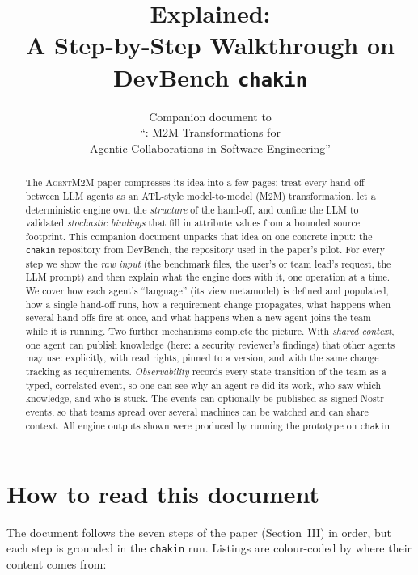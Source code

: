 \documentclass[10pt,a4paper]{article}
\title{\tool{} Explained:\\ A Step-by-Step Walkthrough on DevBench \texttt{chakin}}
\author{Companion document to\\ ``\tool{}: M2M Transformations for\\ Agentic
Collaborations in Software Engineering''}
\date{}
\newcommand{\tool}{\textsc{AgentM2M}}
\theoremstyle{definition}
\begin{document}
\maketitle

\begin{abstract}
The \tool{} paper compresses its idea into a few pages: treat every hand-off
between LLM agents as an ATL-style model-to-model (M2M) transformation, let a
deterministic engine own the \emph{structure} of the hand-off, and confine the
LLM to validated \emph{stochastic bindings} that fill in attribute values from
a bounded source footprint. This companion document unpacks that idea on one
concrete input: the \texttt{chakin} repository from DevBench, the repository
used in the paper's pilot. For every step we show the \emph{raw input} (the
benchmark files, the user's or team lead's request, the LLM prompt) and then
explain what the engine does with it, one operation at a time. We cover how
each agent's ``language'' (its view metamodel) is defined and populated, how a
single hand-off runs, how a requirement change propagates, what happens when
several hand-offs fire at once, and what happens when a new agent joins the
team while it is running. Two further mechanisms complete the picture. With
\emph{shared context}, one agent can publish knowledge (here: a security
reviewer's findings) that other agents may use: explicitly, with read rights,
pinned to a version, and with the same change tracking as requirements.
\emph{Observability} records every state transition of the team as a typed,
correlated event, so one can see why an agent re-did its work, who saw which
knowledge, and who is stuck. The events can optionally be published as
signed Nostr events, so that teams spread over several machines can be
watched and can share context. All engine outputs shown were produced by
running the prototype on \texttt{chakin}.
\end{abstract}

\tableofcontents

\section{How to read this document}\label{sec:read}

The document follows the seven steps of the paper (Section~III) in order, but
each step is grounded in the \texttt{chakin} run. Listings are colour-coded by
where their content comes from:
\end{document}
